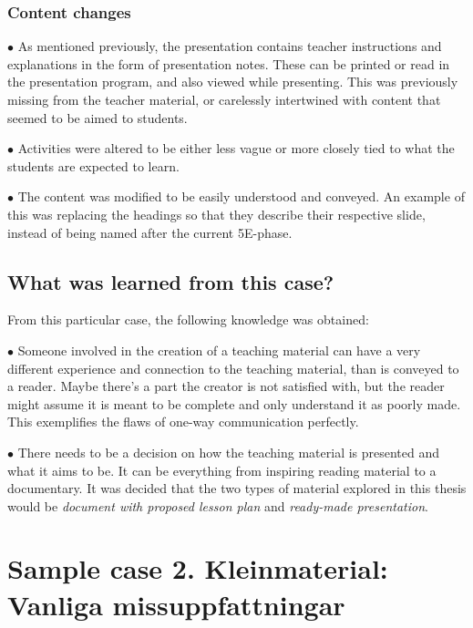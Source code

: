 \subsubsection*{Content changes}
\begin{description}
    \item $\bullet$ As mentioned previously, the presentation contains teacher instructions and explanations in the form of presentation notes. These can be printed or read in the presentation program, and also viewed while presenting. This was previously missing from the teacher material, or carelessly intertwined with content that seemed to be aimed to students.
    \item $\bullet$ Activities were altered to be either less vague or more closely tied to what the students are expected to learn.
    \item $\bullet$ The content was modified to be easily understood and conveyed. An example of this was replacing the headings so that they describe their respective slide, instead of being named after the current 5E-phase.
\end{description}
\subsection{What was learned from this case?}
From this particular case, the following knowledge was obtained:
\begin{description}
    \item $\bullet$ Someone involved in the creation of a teaching material can have a very different experience and connection to the teaching material, than is conveyed to a reader. Maybe there's a part the creator is not satisfied with, but the reader might assume it is meant to be complete and only understand it as poorly made. This exemplifies the flaws of one-way communication perfectly.
    \item $\bullet$ There needs to be a decision on how the teaching material is presented and what it aims to be. It can be everything from inspiring reading material to a documentary. It was decided that the two types of material explored in this thesis would be \textit{document with proposed lesson plan} and \textit{ready-made presentation}.
\end{description}

\section{Sample case 2. Kleinmaterial: Vanliga missuppfattningar}

